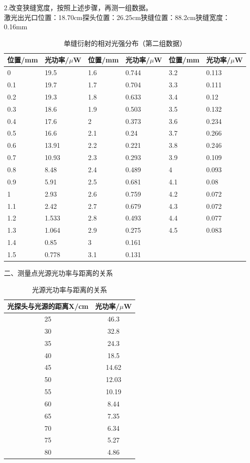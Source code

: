 \documentclass[dvipsnames, svgnames,a4paper,11pt]{article}
\begin{document}
\noindent 2.改变狭缝宽度，按照上述步骤，再测一组数据。\\
激光出光口位置：18.70cm\hspace{4pt}探头位置：26.25cm\hspace{4pt}狭缝位置：88.2cm\hspace{4pt}狭缝宽度：0.16mm
\begin{table}[H]
    \centering
	\caption{单缝衍射的相对光强分布（第二组数据）}
    \begin{tabular}{|l|l|l|l|l|l|}
    \hline
	位置/mm&光功率/$\mu$W&位置/mm&光功率/$\mu$W&位置/mm&光功率/$\mu$W\\ \hline
        0 & 19.5 & 1.6 & 0.744 & 3.2 & 0.113 \\ \hline
        0.1 & 19.7 & 1.7 & 0.704 & 3.3 & 0.111 \\ \hline
        0.2 & 19.3 & 1.8 & 0.633 & 3.4 & 0.12 \\ \hline
        0.3 & 18.6 & 1.9 & 0.503 & 3.5 & 0.132 \\ \hline
        0.4 & 17.6 & 2 & 0.373 & 3.6 & 0.234 \\ \hline
        0.5 & 16.6 & 2.1 & 0.24 & 3.7 & 0.266 \\ \hline
        0.6 & 13.91 & 2.2 & 0.221 & 3.8 & 0.246 \\ \hline
        0.7 & 10.93 & 2.3 & 0.293 & 3.9 & 0.109 \\ \hline
        0.8 & 8.48 & 2.4 & 0.489 & 4 & 0.093 \\ \hline
        0.9 & 5.91 & 2.5 & 0.681 & 4.1 & 0.08 \\ \hline
        1 & 2.93 & 2.6 & 0.759 & 4.2 & 0.072 \\ \hline
        1.1 & 2.42 & 2.7 & 0.679 & 4.3 & 0.072 \\ \hline
        1.2 & 1.533 & 2.8 & 0.493 & 4.4 & 0.077 \\ \hline
        1.3 & 1.064 & 2.9 & 0.275 & 4.5 & 0.083 \\ \hline
        1.4 & 0.85 & 3 & 0.161 & ~ & ~ \\ \hline
        1.5 & 0.778 & 3.1 & 0.131 & ~ & ~ \\ \hline
    \end{tabular}
\end{table}

\noindent 二、测量点光源光功率与距离的关系 
\begin{table}[H]
	\centering
	\caption{光源光功率与距离的关系}
	\begin{tabular}{cc}
		\toprule
		光探头与光源的距离X/cm&光功率/$\mu$W\\
		\midrule
		25&46.3\\
		30&32.8\\
		35&24.3\\
		40&18.5\\
		45&14.62\\
		50&12.03\\
		55&10.19\\
		60&8.44\\
		65&7.35\\
		70&6.34\\
		75&5.27\\
		80&4.86\\
		\toprule
	\end{tabular}
\end{table}
\end{document}
